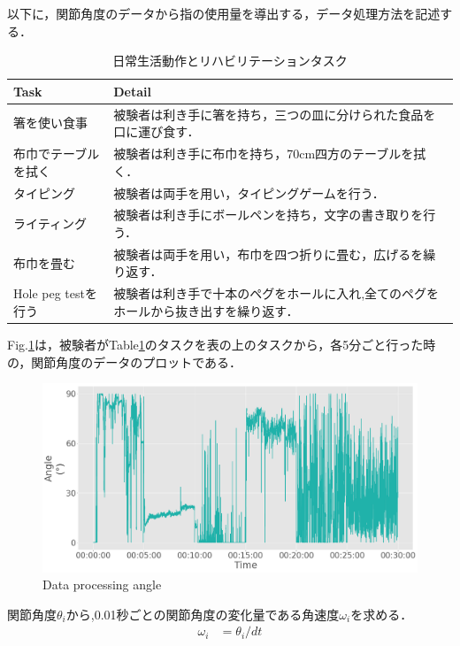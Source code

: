以下に，関節角度のデータから指の使用量を導出する，データ処理方法を記述する．
\begin{table}[H]
  \caption{日常生活動作とリハビリテーションタスク}
  \label{table:tasks}
  \centering
  \begin{tabular}{ll}
    \hline
    Task &  Detail  \\
    \hline \hline
箸を使い食事&
被験者は利き手に箸を持ち，三つの皿に分けられた食品を口に運び食す．\\

布巾でテーブルを拭く&
被験者は利き手に布巾を持ち，70cm四方のテーブルを拭く．\\

タイピング&
被験者は両手を用い，タイピングゲームを行う．\\

ライティング&
被験者は利き手にボールペンを持ち，文字の書き取りを行う．\\

布巾を畳む&
被験者は両手を用い，布巾を四つ折りに畳む，広げるを繰り返す．\\

Hole peg testを行う&
被験者は利き手で十本のペグをホールに入れ,全てのペグをホールから抜き出すを繰り返す．\\

    \hline
  \end{tabular}
\end{table}


Fig.\ref{fig:angle}は，被験者がTable\ref{table:tasks}のタスクを表の上のタスクから，各5分ごと行った時の，関節角度のデータのプロットである．

\begin{figure}[H]
  \centering
  \includegraphics[width=0.8\linewidth]{fig/angle_}
  \caption{Data processing angle}
  \label{fig:angle}
\end{figure}

関節角度$\theta_i$から,0.01秒ごとの関節角度の変化量である角速度$\omega_i$を求める．
\begin{eqnarray}
\omega_i & = \theta_i /dt
\end{eqnarray}

